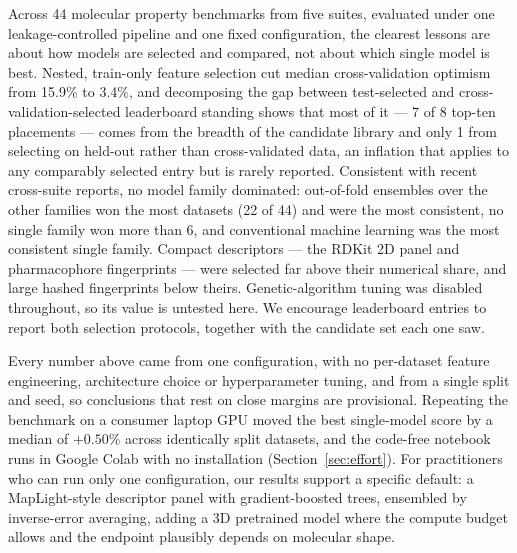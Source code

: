 Across 44 molecular property benchmarks from five suites, evaluated under one leakage-controlled pipeline and one fixed configuration, the clearest lessons are about how models are selected and compared, not about which single model is best. Nested, train-only feature selection cut median cross-validation optimism from 15.9\% to 3.4\%, and decomposing the gap between test-selected and cross-validation-selected leaderboard standing shows that most of it --- 7 of 8 top-ten placements --- comes from the breadth of the candidate library and only 1 from selecting on held-out rather than cross-validated data, an inflation that applies to any comparably selected entry but is rarely reported. Consistent with recent cross-suite reports, no model family dominated: out-of-fold ensembles over the other families won the most datasets (22 of 44) and were the most consistent, no single family won more than 6, and conventional machine learning was the most consistent single family. Compact descriptors --- the RDKit 2D panel and pharmacophore fingerprints --- were selected far above their numerical share, and large hashed fingerprints below theirs. Genetic-algorithm tuning was disabled throughout, so its value is untested here. We encourage leaderboard entries to report both selection protocols, together with the candidate set each one saw.

Every number above came from one configuration, with no per-dataset feature engineering, architecture choice or hyperparameter tuning, and from a single split and seed, so conclusions that rest on close margins are provisional. Repeating the benchmark on a consumer laptop GPU moved the best single-model score by a median of $+0.50$\% across identically split datasets, and the code-free notebook runs in Google Colab with no installation (Section~\ref{sec:effort}). For practitioners who can run only one configuration, our results support a specific default: a MapLight-style descriptor panel with gradient-boosted trees, ensembled by inverse-error averaging, adding a 3D pretrained model where the compute budget allows and the endpoint plausibly depends on molecular shape.


